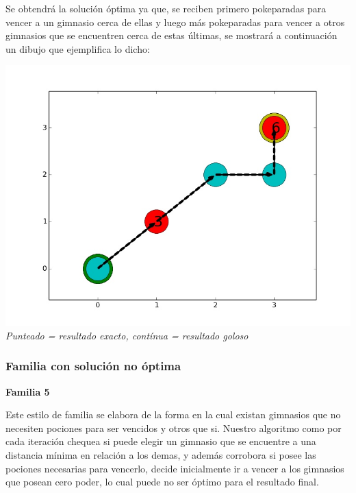Se obtendr\'a la soluci\'on \'optima ya que, se reciben primero pokeparadas para vencer a un gimnasio cerca de ellas y luego m\'as pokeparadas para vencer a otros gimnasios que se encuentren cerca de estas \'ultimas, se mostrar\'a a continuaci\'on un dibujo que ejemplifica lo dicho:

\vspace*{0.3cm} \vspace*{0.3cm}
  \begin{center}
\includegraphics[scale=0.30]{./EJ2/optima.jpeg}
\\{\textit{Punteado = resultado exacto, contínua = resultado goloso}}
  \end{center}
  \vspace*{0.3cm}

\subsubsection*{Familia con soluci\'on no \'optima}

\begin{center}
\textbf{Familia 5}
\end{center}

Este estilo de familia se elabora de la forma en la cual existan gimnasios que no necesiten pociones para ser vencidos y otros que si. Nuestro algoritmo como por cada iteraci\'on chequea si puede elegir un gimnasio que se encuentre a una distancia m\'inima en relaci\'on a los demas, y adem\'as corrobora si posee las pociones necesarias para vencerlo, decide inicialmente ir a vencer a los gimnasios que posean cero poder, lo cual puede no ser \'optimo para el resultado final.

